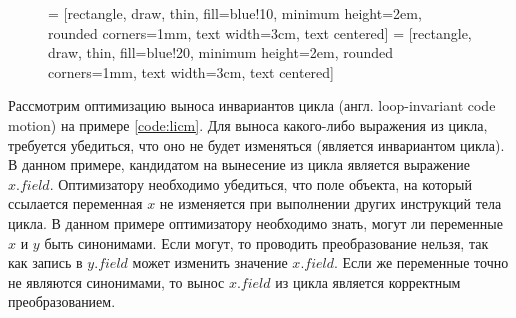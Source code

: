 \documentclass[14pt,titlepage]{extarticle}
\newcommand{\eng}[1]{{\English#1}}
\begin{document}
      \begin{figure}[!htb]
        \centering

         = [rectangle, draw, thin, fill=blue!10,
                            minimum height=2em, rounded corners=1mm,
                            text width=3cm, text centered]
         =  [rectangle, draw, thin, fill=blue!20,
                            minimum height=2em, rounded corners=1mm,
                            text width=3cm, text centered]

      \end{figure}

      Рассмотрим оптимизацию выноса инвариантов цикла (англ.
      \eng{loop-invariant code motion}) на примере \ref{code:licm}.
      Для выноса какого-либо выражения из цикла, требуется убедиться, что оно
      не будет изменяться (является инвариантом цикла).
      В данном примере, кандидатом на вынесение из цикла является выражение
      $x.field$. Оптимизатору необходимо убедиться, что поле объекта, на
      который ссылается переменная $x$ не изменяется при выполнении других
      инструкций тела цикла. В данном примере оптимизатору необходимо знать,
      могут ли переменные $x$ и $y$ быть синонимами. Если могут, то
      проводить преобразование нельзя, так как запись в $y.field$ может
      изменить значение $x.field$. Если же переменные точно не являются
      синонимами, то вынос $x.field$ из цикла является корректным
      преобразованием.
\end{document}
